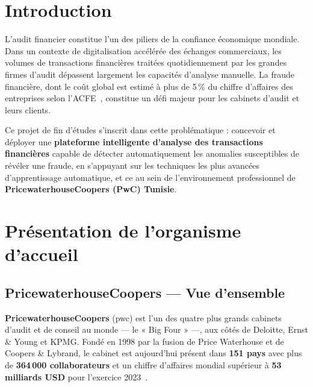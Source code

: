 \documentclass[12pt,a4paper,twoside]{report}
\theoremstyle{definition}
\begin{document}
\section{Introduction}

L'audit financier constitue l'un des piliers de la confiance économique mondiale.
Dans un contexte de digitalisation accélérée des échanges commerciaux, les volumes
de transactions financières traitées quotidiennement par les grandes firmes d'audit
dépassent largement les capacités d'analyse manuelle. La fraude financière, dont le
coût global est estimé à plus de 5\,\% du chiffre d'affaires des entreprises selon
l'ACFE~\cite{acfe2022}, constitue un défi majeur pour les cabinets d'audit et leurs
clients.

Ce projet de fin d'études s'inscrit dans cette problématique : concevoir et déployer
une \textbf{plateforme intelligente d'analyse des transactions financières} capable
de détecter automatiquement les anomalies susceptibles de révéler une fraude, en
s'appuyant sur les techniques les plus avancées d'apprentissage automatique, et ce
au sein de l'environnement professionnel de \textbf{PricewaterhouseCoopers (PwC) Tunisie}.

\section{Présentation de l'organisme d'accueil}

\subsection{PricewaterhouseCoopers — Vue d'ensemble}

\textbf{PricewaterhouseCoopers} (\acrshort{pwc}) est l'un des quatre plus grands
cabinets d'audit et de conseil au monde — le « Big Four » —, aux côtés de Deloitte,
Ernst \& Young et KPMG. Fondé en 1998 par la fusion de Price Waterhouse et de Coopers
\& Lybrand, le cabinet est aujourd'hui présent dans \textbf{151 pays} avec plus de
\textbf{364\,000 collaborateurs} et un chiffre d'affaires mondial supérieur à
\textbf{53 milliards USD} pour l'exercice 2023~\cite{pwcannualreport2023}.
\end{document}
